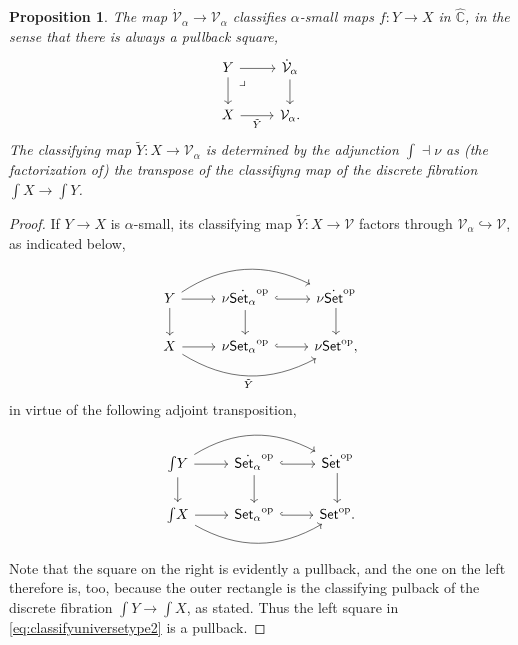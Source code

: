 \documentclass[11pt]{article}
\newcommand{\C}{\ensuremath{\mathbb{C}}}
\newcommand{\op}[1]{\ensuremath{{#1}^{\mathrm{op}}}}
\newcommand{\Set}{\ensuremath{\mathsf{Set}}}
\newcommand{\hook}{\ensuremath{\hookrightarrow}}
\renewcommand{\to}{\ensuremath{\rightarrow}}
\newcommand{\V}{\ensuremath{\mathcal{V}}}
\newcommand{\VV}{\ensuremath{\dot{\mathcal{V}}}}
\newcommand{\elem}[1]{\textstyle\int\!{#1}}
\newcommand{\pbmark}{\ar[dr, phantom, "\lrcorner" very near start, shift right=.5ex]}	%
\newtheorem{proposition}[theorem]{Proposition}
\theoremstyle{remark}
\theoremstyle{definition}
\begin{document}
 \begin{proposition}\label{prop:Valphaclassifies}
The map $\VV_\alpha\to\V_\alpha$ classifies $\alpha$-small maps $f:Y\to X$ in $\widehat{\C}$, in the sense that there is always a pullback square,
\begin{equation}\label{eq:classifyuniversefamilyalpha}\textstyle
\begin{tikzcd}
	 Y \ar[d] \pbmark \ar[r] & \VV_\alpha \ar[d] \\  
	X \ar[r,swap, "\tilde{Y}"] &  \V_\alpha.
 \end{tikzcd}
 \end{equation}
The classifying map $\tilde{Y} : X\to \V_\alpha$ is determined by the adjunction $\int \dashv \nu$ as (the factorization of) the transpose of the classifiyng map of the discrete fibration $\elem X\to\elem Y$. 
\end{proposition}

\begin{proof} If $Y\to X$ is $\alpha$-small, its classifying map $\tilde{Y} : X\to\V$ factors through $\V_\alpha \hook \V$, as indicated below, 
\begin{equation}\label{eq:classifyuniversetype2}\textstyle
\begin{tikzcd}
	 Y \ar[d] \ar[rr, bend left] \ar[r] & \nu\op{\dot{\Set_\alpha}} \ar[d] \ar[r,hook] & \nu\op{\dot{\Set}} \ar[d]\\  
	X \ar[rr, bend right, swap,"\tilde{Y}"] \ar[r] &  \nu\op{\Set_\alpha} \ar[r,hook] &  \nu\op{\Set},
 \end{tikzcd}
 \end{equation}
%
in virtue of the following adjoint transposition,
\begin{equation}\label{eq:adjointtranspose}\textstyle
\begin{tikzcd}
	 \elem Y \ar[d] \ar[rr, bend left] \ar[r] & \op{\dot{\Set_\alpha}} \ar[d] \ar[r,hook] & \op{\dot{\Set}} \ar[d]\\  
	 \elem X \ar[rr, bend right, ] \ar[r]  &  \op{\Set_\alpha} \ar[r,hook]  &  \op{\Set}.
 \end{tikzcd}
  \end{equation}
Note that the square on the right is evidently a pullback, and the one on the left therefore is, too, because the outer rectangle is the classifying pulback of the discrete fibration $\elem Y \to \elem X$, as stated.  Thus the left square in \eqref{eq:classifyuniversetype2} is a pullback.
\end{proof}

\end{document}
